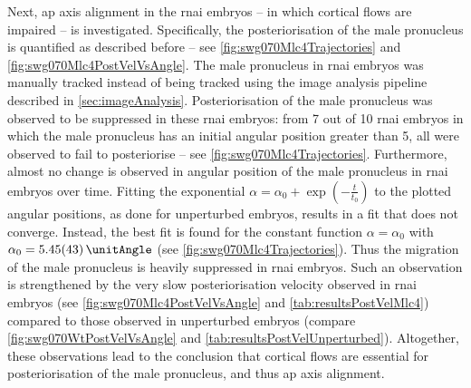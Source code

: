 Next, \ac{ap} axis alignment in the  \ac{rnai} embryos -- in which cortical flows are impaired -- is investigated. Specifically, the posteriorisation of the male pronucleus is quantified as described before -- see \autoref{fig:swg070Mlc4Trajectories} and \autoref{fig:swg070Mlc4PostVelVsAngle}. The male pronucleus in  \ac{rnai} embryos was manually tracked instead of being tracked using the image analysis pipeline described in \autoref{sec:imageAnalysis}. Posteriorisation of the male pronucleus was observed to be suppressed in these  \ac{rnai} embryos: from \num{7} out of \num{10} \ac{rnai} embryos in which the male pronucleus has an initial angular position greater than \SI{5}{\unitAngle}, all were observed to fail to posteriorise -- see \autoref{fig:swg070Mlc4Trajectories}. Furthermore, almost no change is observed in angular position of the male pronucleus in \ac{rnai} embryos over time. Fitting the exponential $\alpha = \alpha_0 + \exp(-\frac{t}{t_0})$ to the plotted angular positions, as done for unperturbed embryos, results in a fit that does not converge. Instead, the best fit is found for the constant function $\alpha = \alpha_0$ with $\alpha_0 = \SI{5.45 +- 0.43}{\unitAngle}$ (see \autoref{fig:swg070Mlc4Trajectories}). Thus the migration of the male pronucleus is heavily suppressed in  \ac{rnai} embryos. Such an observation is strengthened by the very slow posteriorisation velocity observed in  \ac{rnai} embryos (see \autoref{fig:swg070Mlc4PostVelVsAngle} and \autoref{tab:resultsPostVelMlc4}) compared to those observed in unperturbed embryos (compare \autoref{fig:swg070WtPostVelVsAngle} and \autoref{tab:resultsPostVelUnperturbed}). Altogether, these observations lead to the conclusion that cortical flows are essential for posteriorisation of the male pronucleus, and thus \ac{ap} axis alignment.

